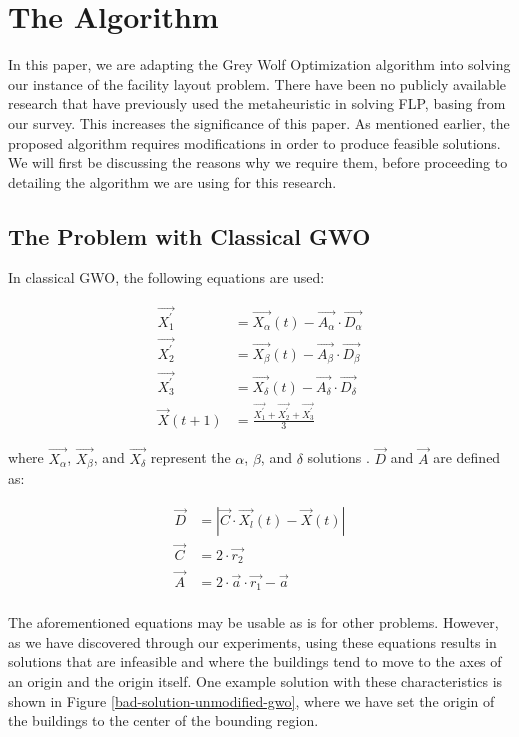\section{The Algorithm}
In this paper, we are adapting the Grey Wolf Optimization algorithm into solving our instance of the facility layout problem. There have been no publicly available research that have previously used the metaheuristic in solving FLP, basing from our survey. This increases the significance of this paper. As mentioned earlier, the proposed algorithm requires modifications in order to produce feasible solutions. We will first be discussing the reasons why we require them, before proceeding to detailing the algorithm we are using for this research.

\subsection{The Problem with Classical GWO}
In classical GWO, the following equations are used:

\begin{align}
	\vec{X_{1}^{'}} &= \vec{X_{\alpha}}(t) - \vec{A_{\alpha}} \cdot \vec{D_{\alpha}} \\
	\vec{X_{2}^{'}} &= \vec{X_{\beta}}(t) - \vec{A_{\beta}} \cdot \vec{D_{\beta}} \\
	\vec{X_{3}^{'}} &= \vec{X_{\delta}}(t) - \vec{A_{\delta}} \cdot \vec{D_{\delta}} \\
	\vec{X}(t + 1)  &= \frac{\vec{X_{1}^{'}} + \vec{X_{2}^{'}} + \vec{X_{3}^{'}}}{3}
\end{align}

where $\vec{X_{\alpha}}$, $\vec{X_{\beta}}$, and $\vec{X_{\delta}}$ represent the $\alpha$, $\beta$, and $\delta$ solutions \cite{Gupta2018}. $\vec{D}$ and $\vec{A}$ are defined as:

\begin{align*}
	\vec{D}        &= \left | \vec{C} \cdot \vec{X_{l}}(t)
	- \vec{X}(t) \right | \\
	\vec{C}        &= 2 \cdot \vec{r_{2}} \\
	\vec{A}        &= 2 \cdot \vec{a} \cdot \vec{r_{1}}
					  - \vec{a}                \\
\end{align*}

The aforementioned equations may be usable as is for other problems. However, as we have discovered through our experiments, using these equations results in solutions that are infeasible and where the buildings tend to move to the axes of an origin and the origin itself. One example solution with these characteristics is shown in Figure \ref{bad-solution-unmodified-gwo}, where we have set the origin of the buildings to the center of the bounding region.

